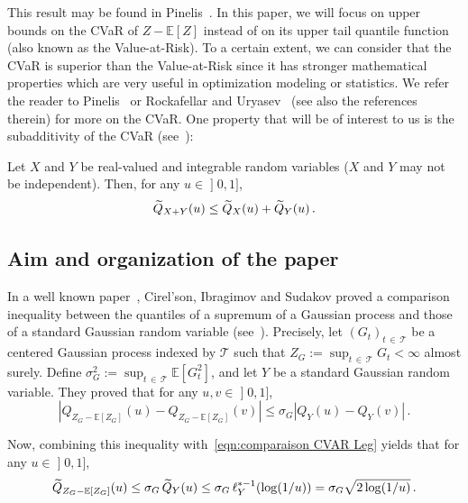 \documentclass[AHL,Unicode,longabstracts,published]{cedram}
\newcommand{\bE}{\mathbb{E}}
\newcommand{\cT}{\mathcal{T}}
\newcommand{\intervalleof}[2]{\mathopen{]} #1\mathclose{}\mathpunct{},#2\mathclose{]}}
\let\oldtilde\tilde
\renewcommand*{\tilde}[1]{\mathchoice{\widetilde{#1}}{\widetilde{#1}}{\oldtilde{#1}}{\oldtilde{#1}}}
\begin{document}
This result may be found in Pinelis~\cite[Theorem~3.4]{Pinelis14b}. In this paper, we will focus on upper bounds on the CVaR of $Z-\bE[Z]$ instead of on its upper tail quantile function (also known as the Value-at-Risk). To a certain extent, we can consider that the CVaR is superior than the Value-at-Risk since it has stronger mathematical properties which are very useful in optimization modeling or statistics. We refer the reader to Pinelis~\cite{Pinelis14b} or Rockafellar and Uryasev~\cite{RU00} (see also the references therein) for more on the CVaR. One property that will be of interest to us is the subadditivity of the CVaR (see~\cite[Theorem~3.4]{Pinelis14b}):

\begin{prop}\label{prop:subadd CVaR}
Let $X$ and $Y$ be real-valued and integrable random variables ($X$ and $Y$ may not be independent). Then, for any $u\in\intervalleof 01$,
\begin{equation*}
\tilde{Q}_{X+Y}(u)\leq \tilde{Q}_X(u)+\tilde{Q}_Y(u)\,.
\end{equation*}
\end{prop}



\subsection{Aim and organization of the paper}

In a well known paper~\cite{CIS76}, Cirel'son, Ibragimov and Sudakov proved a comparison inequality between the quantiles of a supremum of a Gaussian process and those of a standard Gaussian random variable (see~\cite[pages~22-23]{CIS76}). Precisely, let $(G_t)_{t\,\in\,\cT}$ be a centered Gaussian process indexed by $\cT$ such that $Z_G:=\sup_{t\,\in\,\cT}G_t<\infty$ almost surely. Define $\sigma_G^2:=\sup_{t\,\in\,\cT}\bE[G_t^2]$, and let $Y$ be a standard Gaussian random variable. They proved that for any $u,v\in\intervalleof 01$,
\begin{equation}\label{eqn:CIS}
\left|Q_{Z_G-\bE[Z_G]}(u)-Q_{Z_G-\bE[Z_G]}(v)\right|\leq\sigma_G \left|Q_{Y}(u)-Q_Y(v)\right|\,.
\end{equation}


Now, combining this inequality with~\eqref{eqn:comparaison CVAR Leg} yields that for any $u\in\intervalleof 01$,
\begin{equation}\label{eqn:CIS2}
\tilde Q_{Z_G-\bE[Z_G]}(u)\leq \sigma_G\,\tilde Q_Y(u)\leq\sigma_G\,\ell_Y^{*-1}(\log(1/u))=\sigma_G\sqrt{2\log(1/u)}\,.
\end{equation}
\end{document}
